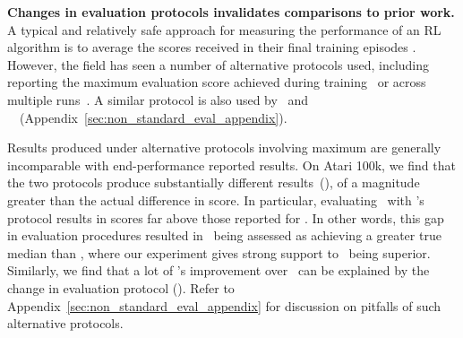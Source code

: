 \textbf{Changes in evaluation protocols invalidates comparisons to prior work.} A typical and relatively safe approach for measuring the performance of an RL algorithm is to average the scores received in their final training episodes \citep{machado2018revisiting}. However, the field has seen a number of alternative protocols used, including reporting the maximum evaluation score achieved during training~\citep{mnih2015human, agarwal2020optimistic, badia2020agent57} or across multiple runs~\citep{jaderberg2016reinforcement, espeholt2018impala, raposo2021synthetic}. A similar protocol is also used by \curl\ and \sunrise~\citep{lee2020sunrise}~(Appendix~\ref{sec:non_standard_eval_appendix}).


Results produced under alternative protocols involving maximum are generally incomparable with end-performance reported results.
On Atari 100k, we find that the two protocols produce substantially different results~(), of a magnitude greater than the actual difference in score. In particular, evaluating \der\ with \curl's protocol results in scores far above those reported for \curl. In other words, this gap in evaluation procedures resulted in \curl\ being assessed as achieving a greater true median than \der, where our experiment gives strong support to \der\ being superior. Similarly, we find that a lot of \sunrise's improvement over \der\ can be explained by the change in evaluation protocol (). Refer to  Appendix~\ref{sec:non_standard_eval_appendix} for discussion on pitfalls of such alternative protocols.






